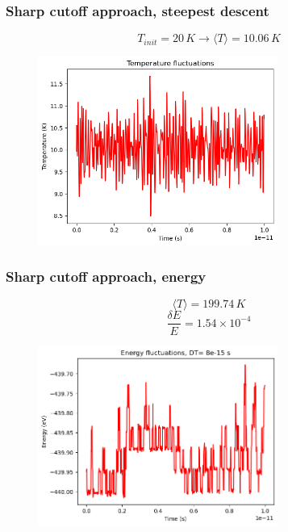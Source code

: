 \documentclass{beamer}
\begin{document}
\begin{frame}
    \frametitle{Sharp cutoff approach, steepest descent}

    $$T_{init}=20\,K \rightarrow \langle T \rangle = 10.06\,K $$

    \begin{figure}
        \includegraphics[width=0.7\textwidth]{images/tempforce.png}
    \end{figure}

\end{frame}


\begin{frame}
    \frametitle{Sharp cutoff approach, energy}

    $$\langle T \rangle = 199.74\,K $$
    $$\frac{\delta E }{E}=1.54 \times 10^{-4}   $$

    \begin{figure}
        \includegraphics[width=0.7\textwidth]{images/awfulenergy.png}
    \end{figure}

\end{frame}
\end{document}

